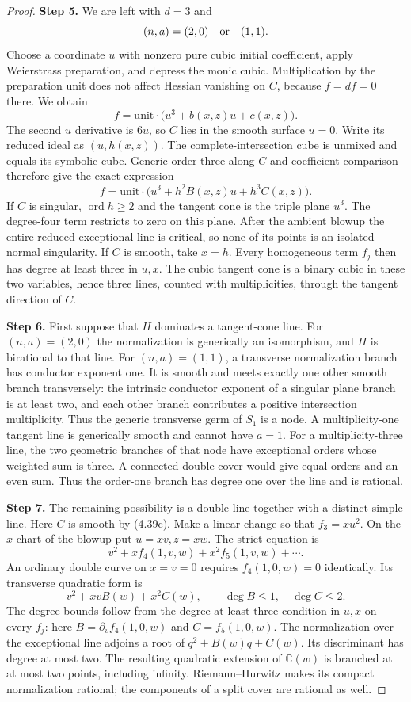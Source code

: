 \begin{proof}
\noindent\textbf{Step 5.} We are left with $d=3$ and
\[
                   (n,a)=(2,0)\quad\hbox{or}\quad(1,1).
\]
Choose a coordinate $u$ with nonzero pure cubic initial
coefficient, apply Weierstrass preparation, and depress the
monic cubic. Multiplication by the preparation unit does not
affect Hessian vanishing on $C$, because $f=df=0$ there.
We obtain
\[
 f=\text{unit}\cdot\bigl(u^3+b(x,z)u+c(x,z)\bigr).
\]
The second $u$ derivative is $6u$, so $C$ lies in the smooth
surface $u=0$. Write its reduced ideal as $(u,h(x,z))$.
The complete-intersection cube is unmixed and equals its
symbolic cube. Generic order three along $C$ and coefficient
comparison therefore give the exact expression
\[
 f=\text{unit}\cdot
       \bigl(u^3+h^2B(x,z)u+h^3C(x,z)\bigr).           \tag{4.39c}
\]
If $C$ is singular, $\operatorname{ord}h\ge2$ and the
tangent cone is the triple plane $u^3$. The degree-four
term restricts to zero on this plane. After the ambient
blowup the entire reduced exceptional line is critical,
so none of its points is an isolated normal singularity.
If $C$ is smooth, take $x=h$. Every homogeneous term $f_j$
then has degree at least three in $u,x$. The cubic tangent
cone is a binary cubic in these two variables, hence three
lines, counted with multiplicities, through the tangent
direction of $C$.

\noindent\textbf{Step 6.} First suppose that $H$ dominates a tangent-cone line.
For $(n,a)=(2,0)$ the normalization is generically an
isomorphism, and $H$ is birational to that line. For
$(n,a)=(1,1)$, a transverse normalization branch has conductor
exponent one. It is smooth and meets exactly one other smooth
branch transversely: the intrinsic conductor exponent of a
singular plane branch is at least two, and each other branch
contributes a positive intersection multiplicity. Thus the
generic transverse germ of $S_1$ is a node. A multiplicity-one
tangent line is generically smooth and cannot have $a=1$.
For a multiplicity-three line, the two geometric branches of
that node have exceptional orders whose weighted sum is three.
A connected double cover would give equal orders and an even
sum. Thus the order-one branch has degree one over the line
and is rational.

\noindent\textbf{Step 7.} The remaining possibility is a double line together with a
distinct simple line. Here $C$ is smooth by (4.39c). Make a
linear change so that $f_3=xu^2$. On the $x$ chart of the
blowup put $u=xv,z=xw$. The strict equation is
\[
 v^2+x f_4(1,v,w)+x^2f_5(1,v,w)+\cdots.
\]
An ordinary double curve on $x=v=0$ requires
$f_4(1,0,w)=0$ identically. Its transverse quadratic form is
\[
 v^2+xvB(w)+x^2C(w),
 \qquad \deg B\le1,\quad\deg C\le2.                  \tag{4.39d}
\]
The degree bounds follow from the degree-at-least-three
condition in $u,x$ on every $f_j$: here
$B=\partial_v f_4(1,0,w)$ and $C=f_5(1,0,w)$.
The normalization over the exceptional line adjoins a root
of $q^2+B(w)q+C(w)$. Its discriminant has degree at most
two. The resulting quadratic extension of $\mathbb C(w)$
is branched at at most two points, including infinity.
Riemann--Hurwitz makes its compact normalization rational;
the components of a split cover are rational as well.


\end{proof}
